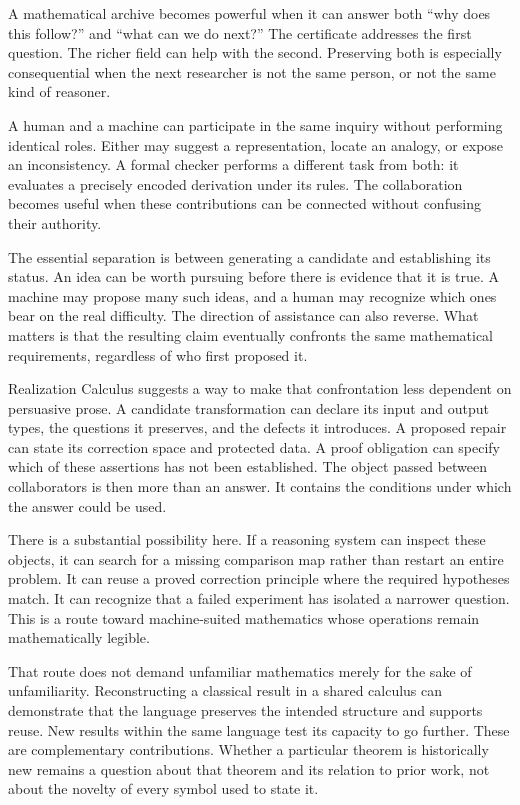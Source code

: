 A mathematical archive becomes powerful when it can answer both ``why does this follow?'' and ``what can we do next?'' The certificate addresses the first question. The richer field can help with the second. Preserving both is especially consequential when the next researcher is not the same person, or not the same kind of reasoner.


A human and a machine can participate in the same inquiry without performing identical roles. Either may suggest a representation, locate an analogy, or expose an inconsistency. A formal checker performs a different task from both: it evaluates a precisely encoded derivation under its rules. The collaboration becomes useful when these contributions can be connected without confusing their authority.

The essential separation is between generating a candidate and establishing its status. An idea can be worth pursuing before there is evidence that it is true. A machine may propose many such ideas, and a human may recognize which ones bear on the real difficulty. The direction of assistance can also reverse. What matters is that the resulting claim eventually confronts the same mathematical requirements, regardless of who first proposed it.

Realization Calculus suggests a way to make that confrontation less dependent on persuasive prose. A candidate transformation can declare its input and output types, the questions it preserves, and the defects it introduces. A proposed repair can state its correction space and protected data. A proof obligation can specify which of these assertions has not been established. The object passed between collaborators is then more than an answer. It contains the conditions under which the answer could be used.

There is a substantial possibility here. If a reasoning system can inspect these objects, it can search for a missing comparison map rather than restart an entire problem. It can reuse a proved correction principle where the required hypotheses match. It can recognize that a failed experiment has isolated a narrower question. This is a route toward machine-suited mathematics whose operations remain mathematically legible.

That route does not demand unfamiliar mathematics merely for the sake of unfamiliarity. Reconstructing a classical result in a shared calculus can demonstrate that the language preserves the intended structure and supports reuse. New results within the same language test its capacity to go further. These are complementary contributions. Whether a particular theorem is historically new remains a question about that theorem and its relation to prior work, not about the novelty of every symbol used to state it.

